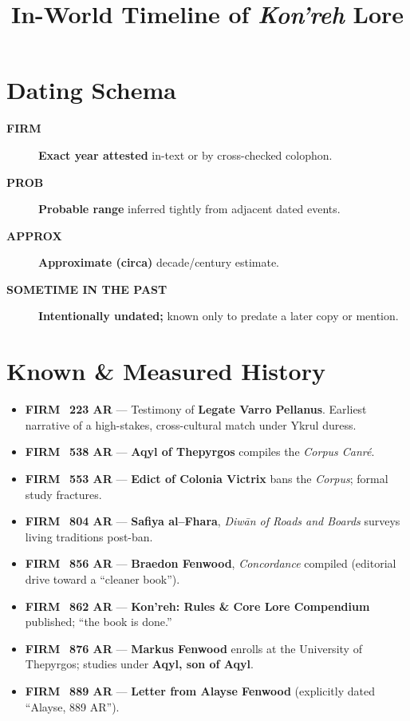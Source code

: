 \documentclass[11pt]{article}
\title{In-World Timeline of \emph{Kon'reh} Lore}
\author{}
\date{}
\newcommand{\badge}[3]{%
  {\setlength{\fboxsep}{2pt}\colorbox{#1}{\textcolor{#2}{\sffamily\footnotesize\textbf{#3}}}}%
}
\newcommand{\firm}{\badge{firmbg}{firmfg}{FIRM}}
\newcommand{\prob}{\badge{probbg}{probfg}{PROB}}
\newcommand{\appx}{\badge{appxbg}{appxfg}{APPROX}}
\newcommand{\past}{\badge{pastbg}{pastfg}{SOMETIME IN THE PAST}}
\begin{document}
\maketitle

\section*{Dating Schema}
\begin{description}
  \item[\firm] \textbf{Exact year attested} in-text or by cross-checked colophon.
  \item[\prob] \textbf{Probable range} inferred tightly from adjacent dated events.
  \item[\appx] \textbf{Approximate (circa)} decade/century estimate.
  \item[\past] \textbf{Intentionally undated;} known only to predate a later copy or mention.
\end{description}

\section*{Known \& Measured History}
\begin{itemize}
  \item \firm\ \textbf{223 AR} --- Testimony of \textbf{Legate Varro Pellanus}. Earliest narrative of a high-stakes, cross-cultural match under Ykrul duress.
  \item \firm\ \textbf{538 AR} --- \textbf{Aqyl of Thepyrgos} compiles the \emph{Corpus Canré}.
  \item \firm\ \textbf{553 AR} --- \textbf{Edict of Colonia Victrix} bans the \emph{Corpus}; formal study fractures.
  \item \firm\ \textbf{804 AR} --- \textbf{Safiya al--Fhara}, \emph{Diwān of Roads and Boards} surveys living traditions post-ban.
  \item \firm\ \textbf{856 AR} --- \textbf{Braedon Fenwood}, \emph{Concordance} compiled (editorial drive toward a ``cleaner book'').
  \item \firm\ \textbf{862 AR} --- \textbf{Kon'reh: Rules \& Core Lore Compendium} published; ``the book is done.''
  \item \firm\ \textbf{876 AR} --- \textbf{Markus Fenwood} enrolls at the University of Thepyrgos; studies under \textbf{Aqyl, son of Aqyl}.
  \item \firm\ \textbf{889 AR} --- \textbf{Letter from Alayse Fenwood} (explicitly dated ``Alayse, 889 AR'').
\end{itemize}
\end{document}
